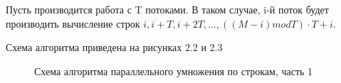 \documentclass[12pt,a4paper]{report}
\begin{document}
Пусть производится работа с T потоками. В таком случае, i-й поток будет производить вычисление строк
$i, i + T, i + 2T, \dots, ((M - i) mod T) \cdot T + i$.

Схема алгоритма приведена на рисунках 2.2 и 2.3

\begin{figure}[h!]
    \caption{Схема алгоритма параллельного умножения по строкам, часть 1}
    \label{fig:image}
\end{figure}
\end{document}
